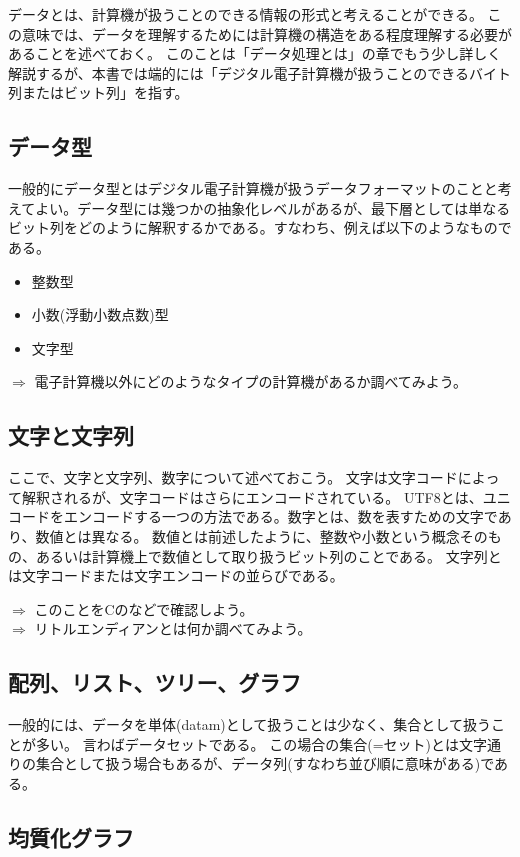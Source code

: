 データとは、計算機が扱うことのできる情報の形式と考えることができる。
この意味では、データを理解するためには計算機の構造をある程度理解する必要があることを述べておく。
このことは「データ処理とは」の章でもう少し詳しく解説するが、本書では端的には「デジタル電子計算機が扱うことのできるバイト列またはビット列」を指す。
\subsection{データ型}
一般的にデータ型とはデジタル電子計算機が扱うデータフォーマットのことと考えてよい。データ型には幾つかの抽象化レベルがあるが、最下層としては単なるビット列をどのように解釈するかである。すなわち、例えば以下のようなものである。
\begin{itemize}
\item 整数型
\item 小数(浮動小数点数)型
\item 文字型
\end{itemize}
\begin{breakbox}
$\Rightarrow$ 電子計算機以外にどのようなタイプの計算機があるか調べてみよう。
\end{breakbox}

\subsection{文字と文字列}
ここで、文字と文字列、数字について述べておこう。
文字は文字コードによって解釈されるが、文字コードはさらにエンコードされている。
UTF8とは、ユニコードをエンコードする一つの方法である。数字とは、数を表すための文字であり、数値とは異なる。
数値とは前述したように、整数や小数という概念そのもの、あるいは計算機上で数値として取り扱うビット列のことである。
文字列とは文字コードまたは文字エンコードの並らびである。
\begin{breakbox}
$\Rightarrow$ このことをCのなどで確認しよう。\\
$\Rightarrow$ リトルエンディアンとは何か調べてみよう。
\end{breakbox}

\subsection{配列、リスト、ツリー、グラフ}
一般的には、データを単体(datam)として扱うことは少なく、集合として扱うことが多い。
言わばデータセットである。
この場合の集合(=セット)とは文字通りの集合として扱う場合もあるが、データ列(すなわち並び順に意味がある)である。

\subsection{均質化グラフ}
